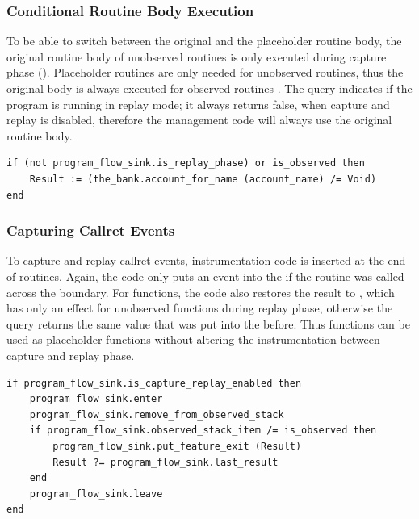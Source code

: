 \subsubsection{Conditional Routine Body Execution}
To be able to switch between the original and the placeholder routine body, the original routine body of unobserved routines is only executed during capture phase (). Placeholder routines are only needed for unobserved routines, thus the original body is always executed for observed routines . The query  indicates if the program is running in replay mode; it always returns false, when capture and replay is disabled, therefore the management code will always use the original routine body.

\begin{lstlisting}[caption=Conditional Methodbody,label=lst:methodbody_instrumentation]
if (not program_flow_sink.is_replay_phase) or is_observed then
	Result := (the_bank.account_for_name (account_name) /= Void)
end
\end{lstlisting}


\subsubsection{Capturing Callret Events}
To capture and replay callret events, instrumentation code is inserted at the end of routines. Again, the code only puts an event into the  if the routine was called across the boundary. For functions, the code also restores the result to , which has only an effect for unobserved functions during replay phase, otherwise the query  returns the same value that was put into the  before. Thus functions can be used as placeholder functions without altering the instrumentation between capture and replay phase.
\begin{lstlisting}[caption=Instrumentation to Capture Callret Events,label=lst:exit_instrumentation]
if program_flow_sink.is_capture_replay_enabled then
	program_flow_sink.enter
	program_flow_sink.remove_from_observed_stack
	if program_flow_sink.observed_stack_item /= is_observed then
		program_flow_sink.put_feature_exit (Result)
		Result ?= program_flow_sink.last_result
	end
	program_flow_sink.leave
end
\end{lstlisting}


